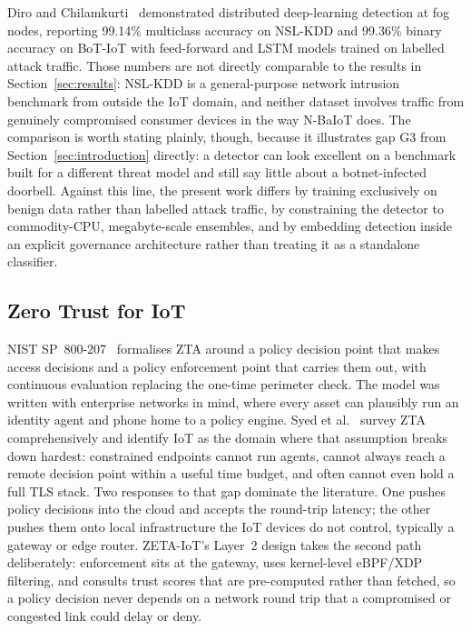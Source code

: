\documentclass[sigconf,review,anonymous]{acmart}
\begin{document}
Diro and Chilamkurti~\cite{diro2018} demonstrated distributed deep-learning detection at fog nodes, reporting 99.14\% multiclass accuracy on NSL-KDD and 99.36\% binary accuracy on BoT-IoT with feed-forward and LSTM models trained on labelled attack traffic. Those numbers are not directly comparable to the results in Section~\ref{sec:results}: NSL-KDD is a general-purpose network intrusion benchmark from outside the IoT domain, and neither dataset involves traffic from genuinely compromised consumer devices in the way N-BaIoT does. The comparison is worth stating plainly, though, because it illustrates gap G3 from Section~\ref{sec:introduction} directly: a detector can look excellent on a benchmark built for a different threat model and still say little about a botnet-infected doorbell. Against this line, the present work differs by training exclusively on benign data rather than labelled attack traffic, by constraining the detector to commodity-CPU, megabyte-scale ensembles, and by embedding detection inside an explicit governance architecture rather than treating it as a standalone classifier.

\subsection{Zero Trust for IoT}
NIST SP~800-207~\cite{nist800207} formalises ZTA around a policy decision point that makes access decisions and a policy enforcement point that carries them out, with continuous evaluation replacing the one-time perimeter check. The model was written with enterprise networks in mind, where every asset can plausibly run an identity agent and phone home to a policy engine. Syed et al.~\cite{syed2022zta} survey ZTA comprehensively and identify IoT as the domain where that assumption breaks down hardest: constrained endpoints cannot run agents, cannot always reach a remote decision point within a useful time budget, and often cannot even hold a full TLS stack. Two responses to that gap dominate the literature. One pushes policy decisions into the cloud and accepts the round-trip latency; the other pushes them onto local infrastructure the IoT devices do not control, typically a gateway or edge router. ZETA-IoT's Layer~2 design takes the second path deliberately: enforcement sits at the gateway, uses kernel-level eBPF/XDP filtering, and consults trust scores that are pre-computed rather than fetched, so a policy decision never depends on a network round trip that a compromised or congested link could delay or deny.
\end{document}
